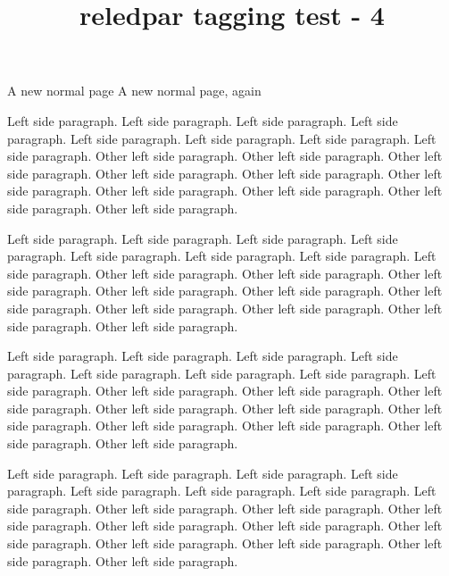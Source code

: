 \documentclass[a5paper,11pt]{article}
\title{reledpar tagging test - 4}
\begin{document}
A new normal page
\newpage
A new normal page, again

\begin{pages}
    \begin{Leftside}
        \beginnumbering
            \pstart
                Left side paragraph. Left side paragraph. Left side paragraph. Left side paragraph. Left side paragraph. Left side paragraph. Left side paragraph. Left side paragraph.
            \pend
            \pstart
                Other left side paragraph.  Other left side paragraph.  Other left side paragraph.  Other left side paragraph.  Other left side paragraph.  Other left side paragraph.  Other left side paragraph.  Other left side paragraph.  Other left side paragraph.  Other left side paragraph.
            \pend

                        \pstart
                Left side paragraph. Left side paragraph. Left side paragraph. Left side paragraph. Left side paragraph. Left side paragraph. Left side paragraph. Left side paragraph.
            \pend
            \pstart
                Other left side paragraph.  Other left side paragraph.  Other left side paragraph.  Other left side paragraph.  Other left side paragraph.  Other left side paragraph.  Other left side paragraph.  Other left side paragraph.  Other left side paragraph.  Other left side paragraph.
            \pend

                        \pstart
                Left side paragraph. Left side paragraph. Left side paragraph. Left side paragraph. Left side paragraph. Left side paragraph. Left side paragraph. Left side paragraph.
            \pend
            \pstart
                Other left side paragraph.  Other left side paragraph.  Other left side paragraph.  Other left side paragraph.  Other left side paragraph.  Other left side paragraph.  Other left side paragraph.  Other left side paragraph.  Other left side paragraph.  Other left side paragraph.
            \pend

                        \pstart
                Left side paragraph. Left side paragraph. Left side paragraph. Left side paragraph. Left side paragraph. Left side paragraph. Left side paragraph. Left side paragraph.
            \pend
            \pstart
                Other left side paragraph.  Other left side paragraph.  Other left side paragraph.  Other left side paragraph.  Other left side paragraph.  Other left side paragraph.  Other left side paragraph.  Other left side paragraph.  Other left side paragraph.  Other left side paragraph.
            \pend


\end{Leftside}
\end{pages}
\end{document}
